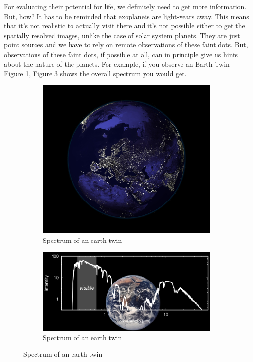 \documentclass[]{article}
\begin{document}
For evaluating their potential for life,
we definitely need to get
more information.
But, how?
It has to be reminded that
exoplanets are light-years away.
This means that it's not realistic
to actually visit there
and it's not possible either
to get the spatially resolved images,
unlike the case of solar system planets.
They are just point sources
and we have to rely on remote
observations of these faint dots.
But, observations of these faint dots,
if possible at all,
can in principle give us hints
about the nature of the planets.
For example,
if you observe an Earth Twin--Figure \ref{fig:spectrum:earth:twin0},
Figure \ref{fig:spectrum:earth:twin} shows the overall spectrum
you would get.

\begin{figure}[H]
	\caption{Spectrum of an earth twin}
	\begin{subfigure}[b]{0.3\textwidth}
		\caption{Spectrum of an earth twin}\label{fig:spectrum:earth:twin0}
		\includegraphics[width=\textwidth]{Tellus}
	\end{subfigure}
	\begin{subfigure}[b]{0.3\textwidth}
		\caption{Spectrum of an earth twin}\label{fig:spectrum:earth:twin}
		\includegraphics[width=\textwidth]{SpectrumEarthTwin}

\end{subfigure}
\end{figure}
\end{document}
